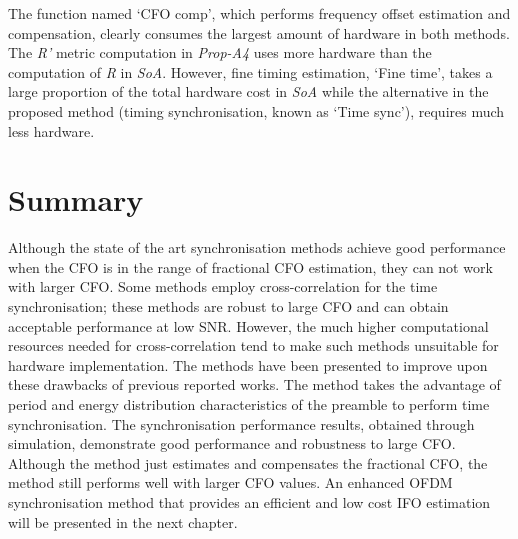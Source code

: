 The function named `CFO comp', which performs frequency offset estimation and compensation, clearly consumes the largest amount of hardware in both methods.
The \emph{R'} metric computation in \textit{Prop-A4} uses more hardware than the computation of \emph{R} in \textit{SoA}. However, fine timing estimation, `Fine time', takes a large proportion of the total hardware cost in \textit{SoA} while the alternative in the proposed method (timing synchronisation, known as `Time sync'), requires much less hardware.

\section{Summary}

Although the state of the art synchronisation methods achieve good performance when the CFO is in the range of fractional CFO estimation, they can not work with larger CFO.
Some methods employ cross-correlation for the time synchronisation; these methods are robust to large CFO and can obtain acceptable performance at low SNR.
However, the much higher computational resources needed for cross-correlation tend to make such methods unsuitable for hardware implementation.
The methods have been presented to improve upon these drawbacks of previous reported works.
The method takes the advantage of period and energy distribution characteristics of the preamble to perform time synchronisation.
The synchronisation performance results, obtained through simulation, demonstrate good performance and robustness to large CFO.
Although the method just estimates and compensates the fractional CFO, the method still performs well with larger CFO values.
An enhanced OFDM synchronisation method that provides an efficient and low cost IFO estimation will be presented in the next chapter.
